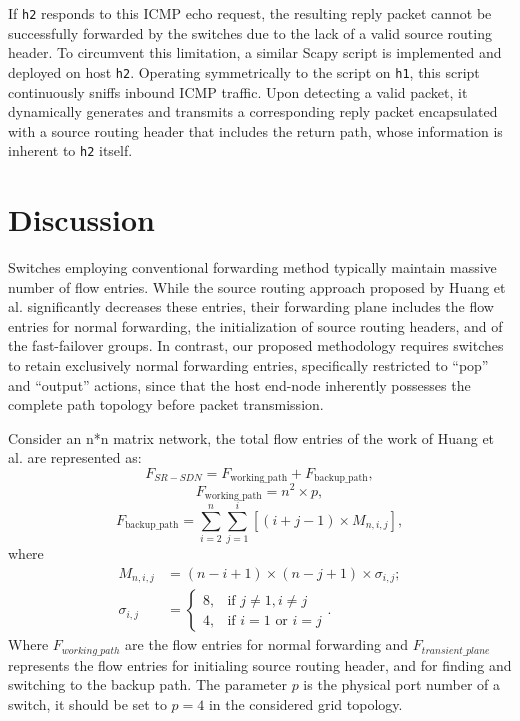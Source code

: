 \documentclass[conference]{IEEEtran}
\begin{document}
If \verb|h2| responds to this ICMP echo request, the resulting reply packet cannot be successfully forwarded by the switches due to the lack of a valid source routing header. To circumvent this limitation, a similar Scapy script is implemented and deployed on host \verb|h2|. Operating symmetrically to the script on \verb|h1|, this script continuously sniffs inbound ICMP traffic. Upon detecting a valid packet, it dynamically generates and transmits a corresponding reply packet encapsulated with a source routing header that includes the return path, whose information is inherent to \verb|h2| itself.

\section{Discussion}
Switches employing conventional forwarding method typically maintain massive number of flow entries. While the source routing approach proposed by Huang et al. significantly decreases these entries, their forwarding plane includes the flow entries for normal forwarding, the initialization of source routing headers, and of the fast-failover groups. In contrast, our proposed methodology requires switches to retain exclusively normal forwarding entries, specifically restricted to ``pop'' and ``output'' actions, since that the host end-node inherently possesses the complete path topology before packet transmission. 

Consider an n*n matrix network, the total flow entries of the work of Huang et al. are represented as:
\begin{equation*}
    F_{SR-SDN} = F_{\text{working\_path}} + F_{\text{backup\_path}},
\end{equation*}
\begin{equation*}
    F_{\text{working\_path}} = n^2 \times p,
\end{equation*}
\begin{equation*}
    F_{\text{backup\_path}} = \sum_{i=2}^{n} \sum_{j=1}^{i} [(i + j - 1) \times M_{n,i,j}],
\end{equation*}
where
\begin{align*}
    M_{n,i,j} &= (n - i + 1) \times (n - j + 1) \times \sigma_{i,j}; \\ \sigma_{i,j} &= 
    \begin{cases} 
        8, & \text{if } j \neq 1, i \neq j \\ 
        4, & \text{if } i = 1 \text{ or } i = j 
    \end{cases}.
\end{align*}
Where $F_{working\_path}$ are the flow entries for normal forwarding and $F_{transient\_plane}$ represents the flow entries for initialing source routing header, and for finding and switching to the backup path. The parameter $p$ is the physical port number of a switch, it should be set to $p=4$ in the considered grid topology.
\end{document}
